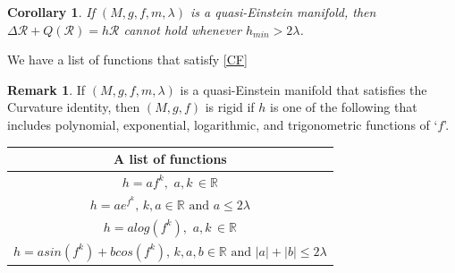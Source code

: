 \documentclass[12pt]{amsart}
\newtheorem{corollary}[theorem]{Corollary}
\theoremstyle{definition}
\newtheorem{remark}[theorem]{Remark}
\numberwithin{equation}{section}
\begin{document}
\begin{corollary}
    If $(M,g,f,m,\lambda)$ is a quasi-Einstein manifold, then $\Delta \mathcal{R} + Q(\mathcal{R}) = h\mathcal{R}$ cannot hold whenever $h_{min} > 2\lambda$.
\end{corollary}
 We have a list of functions that satisfy \cref{CF}
\begin{remark}
If $(M,g,f,m,\lambda)$ is a quasi-Einstein manifold that satisfies the Curvature identity, then $(M,g,f)$ is rigid if $h$ is one of the following that includes polynomial, exponential, logarithmic, and trigonometric functions of `$f$'.
\begin{center}
\begin{table}[h!]
\begin{tabular}{|c|}
\hline
\textbf{A list of functions} \\ \hline
$h = af^{k},\,\,a,k\,\in \mathbb{R}$\\
$h = ae^{f^{k}},\,k,a\in \mathbb{R} \,\,\text{and}\,\,a \leq 2\lambda$\\
$h = a log(f^{k}),\,\,a,k\,\in \mathbb{R}$\\
$h = a sin(f^{k}) + b cos(f^{k}) ,\,k,a,b\in \mathbb{R} \,\,\text{and}\,\,|a| + |b|\leq 2\lambda$\\
 \hline
\end{tabular}
\label{tab:onecol}
\end{table}
\end{center}
\end{remark}



\end{document}

